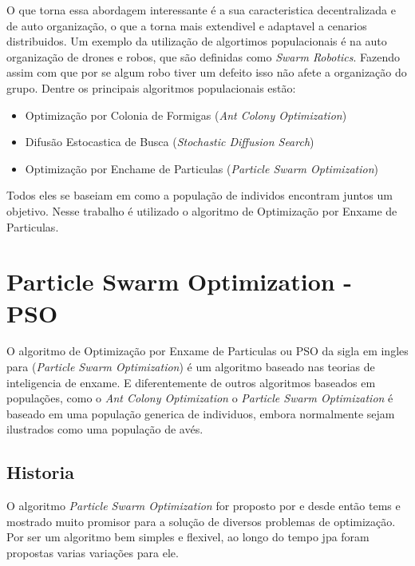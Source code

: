         O que torna essa abordagem interessante é a sua caracteristica decentralizada e de auto organização, o que a torna mais extendivel e adaptavel a cenarios distribuidos. Um exemplo da utilização de algortimos populacionais é na auto organização de drones e robos, que são definidas como \textit{Swarm Robotics}. Fazendo assim com que por se algum robo tiver um defeito isso não afete a organização do grupo. \newline
        Dentre os principais algoritmos populacionais estão:
        \begin{itemize}
            \item Optimização por Colonia de Formigas (\textit{Ant Colony Optimization}) 
            \item Difusão Estocastica de Busca (\textit{Stochastic Diffusion Search})
            \item Optimização por Enchame de Particulas (\textit{Particle Swarm Optimization})
        \end{itemize}
        
        Todos eles se baseiam em como a população de individos encontram juntos um objetivo. Nesse trabalho é utilizado o algoritmo de Optimização por Enxame de Particulas. 


\section{Particle Swarm Optimization - PSO}
        O algoritmo de Optimização por Enxame de Particulas ou PSO da sigla em ingles para (\textit{Particle Swarm Optimization}) é um algoritmo baseado nas teorias de inteligencia de enxame. E diferentemente de outros algoritmos baseados em populações, como o \textit{Ant Colony Optimization} o \textit{Particle Swarm Optimization} é baseado em uma população generica de individuos, embora normalmente sejam ilustrados como uma população de avés.


    \subsection{Historia}
        O algoritmo \textit{Particle Swarm Optimization} for proposto por \cite{Kennedy1995} e desde então tems e mostrado muito promisor para a solução de diversos problemas de optimização. Por ser um algoritmo bem simples e flexivel, ao longo do tempo jpa foram propostas varias variações para ele. \newline
        
